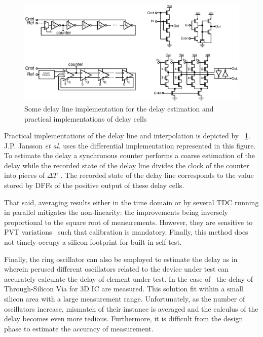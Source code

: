 \begin{figure}[htp]
    \centering
    \includegraphics[width=\textwidth]{Chapter5/Figs/delay_line_implementation_possible.ps}
    \caption{Some delay line implementation for the delay estimation and practical implementations of delay cells}
    \label{fig:delay_vernier_interpolation}
\end{figure}

Practical implementations of the delay line and interpolation is depicted by \figurename~\ref{fig:delay_vernier_interpolation}. J.P. Jansson \textit{et al.} uses the differential implementation represented in this figure. To estimate the delay a synchronous counter performs a coarse estimation of the delay while the recorded state of the delay line divides the clock of the counter into pieces of \(\Delta T\)~\cite{1637593}. The recorded state of the delay line corresponds to the value stored by DFFs of the positive output of these delay cells.

That said, averaging results either in the time domain or by several TDC running in parallel mitigates the non-linearity: the improvements being inversely proportional to the square root of measurements. However, they are sensitive to PVT variations~\cite{6233014, 5256168} such that calibration is mandatory. Finally, this method does not timely occupy a silicon footprint for built-in self-test.

Finally, the ring oscillator can also be employed to estimate the delay as in~\cite{8267856} wherein perused different oscillators related to the device under test can accurately calculate the delay of element under test. In the case of~\cite{8267856} the delay of Through-Silicon Via for 3D IC are measured. This solution fit within a small silicon area with a large measurement range. Unfortunately, as the number of oscillators increase, mismatch of their instance is averaged and the calculus of the delay becomes even more tedious. Furthermore, it is difficult from the design phase to estimate the accuracy of measurement.

